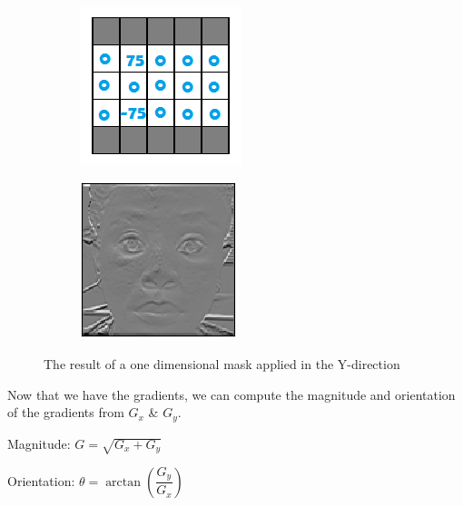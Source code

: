\begin{figure}[H]
\centering
\begin{subfigure}{.5\textwidth}
  \centering
  \includegraphics[width=.5\linewidth]{gy}
  \label{fig:sub1}
\end{subfigure}%
\begin{subfigure}{.5\textwidth}
  \centering
  \includegraphics[width=.5\linewidth]{dy}
  \label{fig:sub2}
\end{subfigure}
\caption{The result of a one dimensional mask applied in the Y-direction}
\label{fig:test}
\end{figure}


Now that we have the gradients, we can compute the magnitude and orientation of the gradients from  $G_x$ \& $G_y$.

Magnitude: $G = \sqrt{G_x + G_y}$

Orientation: $\theta = \arctan(\dfrac{G_y}{G_x})$

